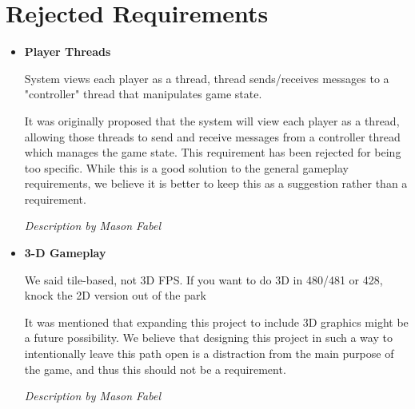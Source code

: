 \documentclass[12pt]{report}
\begin{document}
\section{Rejected Requirements}
	\begin{itemize}
		\item \textbf{Player Threads}
		
		System views each player as a thread, thread sends/receives messages
		to a "controller" thread that manipulates game state.
		
		It was originally proposed that the system will view each player as a
		thread, allowing those threads to send and receive messages from a
		controller thread which manages the game state. This requirement has been
		rejected for being too specific. While this is a good solution to the
		general gameplay requirements, we believe it is better to keep this as a
		suggestion rather than a requirement.
		
		\emph{Description by Mason Fabel}
		
		\item \textbf{3-D Gameplay}
		
		We said tile-based, not 3D FPS. If you want to do 3D in 480/481 or
		428, knock the 2D version out of the park 
		
		It was mentioned that expanding this project to include 3D graphics might
		be a future possibility. We believe that designing this project in such a
		way to intentionally leave this path open is a distraction from the main
		purpose of the game, and thus this should not be a requirement.
		
		\emph{Description by Mason Fabel}
		
	\end{itemize}
\end{document}
